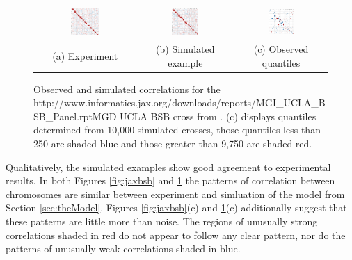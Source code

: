 \documentclass{article}
\newcommand{\href}[1]{#1} %
\begin{document}
\begin{figure}[htp]
  \begin{center}
    \begin{tabular}{ccc}
      \includegraphics[width = 0.300\textwidth]{./img/uclabsb.png} &
      \includegraphics[width = 0.300\textwidth]{./img/uclabsb_sim.png} &
      \includegraphics[width = 0.300\textwidth]{./img/uclabsb_quant.png} \\
      {\footnotesize (a) Experiment} &
      {\footnotesize (b) Simulated example} &
      {\footnotesize (c) Observed quantiles} \\
    \end{tabular}
  \end{center}
  \caption{Observed and simulated correlations for the \href{http://www.informatics.jax.org/downloads/reports/MGI_UCLA_BSB_Panel.rpt}{MGD UCLA BSB cross} from \cite{welchetal1996uclabsb}. (c) displays quantiles determined from 10,000 simulated crosses, those quantiles less than 250 are shaded blue and those greater than 9,750 are shaded red.}
  \label{fig:uclabsb}
\end{figure}

Qualitatively, the simulated examples show good agreement to experimental results. In both Figures \ref{fig:jaxbsb} and \ref{fig:uclabsb} the patterns of correlation between chromosomes are similar between experiment and simluation of the model from Section \ref{sec:theModel}. Figures \ref{fig:jaxbsb}(c) and \ref{fig:uclabsb}(c) additionally suggest that these patterns are little more than noise. The regions of unusually strong correlations shaded in red do not appear to follow any clear pattern, nor do the patterns of unusually weak correlations shaded in blue.
\end{document}

